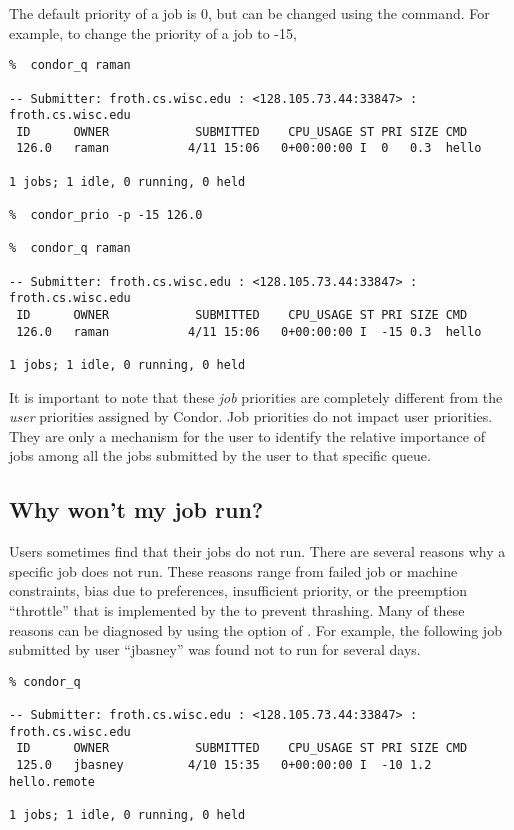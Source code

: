 The default priority of a job is 0, but can be changed using the 
command.  For example, to change the priority of a job to -15,
\begin{verbatim}
%  condor_q raman

-- Submitter: froth.cs.wisc.edu : <128.105.73.44:33847> : froth.cs.wisc.edu
 ID      OWNER            SUBMITTED    CPU_USAGE ST PRI SIZE CMD               
 126.0   raman           4/11 15:06   0+00:00:00 I  0   0.3  hello             

1 jobs; 1 idle, 0 running, 0 held

%  condor_prio -p -15 126.0

%  condor_q raman

-- Submitter: froth.cs.wisc.edu : <128.105.73.44:33847> : froth.cs.wisc.edu
 ID      OWNER            SUBMITTED    CPU_USAGE ST PRI SIZE CMD               
 126.0   raman           4/11 15:06   0+00:00:00 I  -15 0.3  hello             

1 jobs; 1 idle, 0 running, 0 held
\end{verbatim}

It is important to note that these \emph{job} priorities are completely 
different from the \emph{user} priorities assigned by Condor.  Job priorities
do not impact user priorities.  They are only a mechanism for the user to
identify the relative importance of jobs among all the jobs submitted by the
user to that specific queue.

\subsection{Why won't my job run?}
Users sometimes find that their jobs do not run.  There are several reasons why
a specific job does not run.  These reasons range from failed job or machine
constraints, bias due to preferences, insufficient priority, or the preemption
``throttle'' that is implemented by the  to prevent
thrashing.  Many of these reasons can be diagnosed by using the 
option of .  For example, the following job submitted by user
``jbasney'' was found not to run for several days.
\begin{verbatim}
% condor_q

-- Submitter: froth.cs.wisc.edu : <128.105.73.44:33847> : froth.cs.wisc.edu
 ID      OWNER            SUBMITTED    CPU_USAGE ST PRI SIZE CMD               
 125.0   jbasney         4/10 15:35   0+00:00:00 I  -10 1.2  hello.remote      

1 jobs; 1 idle, 0 running, 0 held
\end{verbatim}

